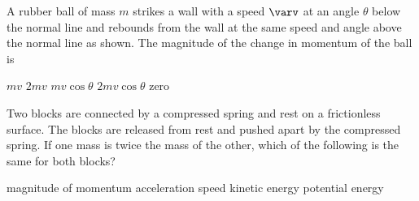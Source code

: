 \documentclass{../../oss-apphys-exam}
\begin{document}
\genheader


\genmultidirections

\gengravity

\raggedcolumns
\begin{multicols*}{2}
  \begin{questions}
    \question A rubber ball of mass $m$ strikes a wall with a speed $\varv$ at
    an angle $\theta$ below the normal line and rebounds from the wall at the
    same speed and angle above the normal line as shown. The magnitude of the
    change in momentum of the ball is
    \begin{center}
    \end{center}
    \begin{choices}
      \choice $mv$
      \choice $2mv$
      \choice $mv\cos\theta$
      \choice $2mv\cos\theta$
      \choice  zero
    \end{choices}
    
    \question Two blocks are connected by a compressed spring and rest on a
    frictionless surface. The blocks are released from rest and pushed apart
    by the compressed spring. If one mass is twice the mass of the other,
    which of the following is the same for both blocks?
    \begin{choices}
      \choice magnitude of momentum
      \choice acceleration
      \choice speed
      \choice kinetic energy
      \choice potential energy
    \end{choices}
    \columnbreak
    

\end{questions}
\end{multicols*}
\end{document}
